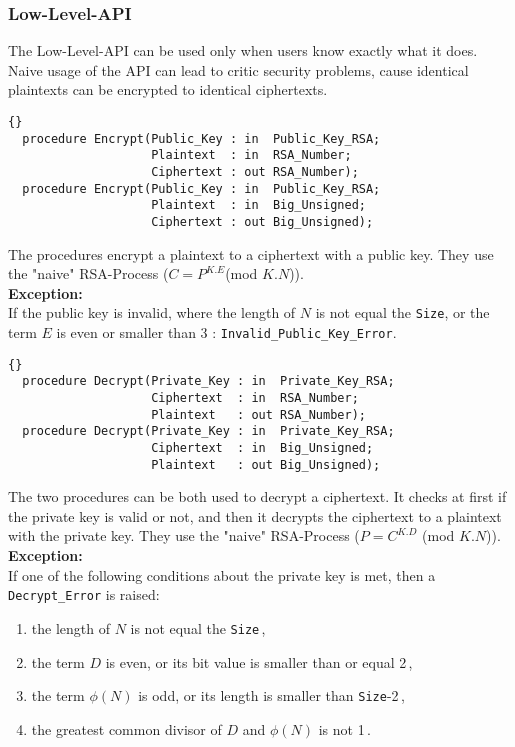 \subsubsection*{Low-Level-API}
The Low-Level-API can be used only when users know exactly what it
does. Naive usage of the API can lead to critic security problems,
cause identical plaintexts can be encrypted to identical ciphertexts.
\begin{lstlisting}{}
  procedure Encrypt(Public_Key : in  Public_Key_RSA;
                    Plaintext  : in  RSA_Number;
                    Ciphertext : out RSA_Number);
  procedure Encrypt(Public_Key : in  Public_Key_RSA;
                    Plaintext  : in  Big_Unsigned;
                    Ciphertext : out Big_Unsigned);
\end{lstlisting}
The procedures encrypt a plaintext to a ciphertext with a public
key. They use the "naive" RSA-Process ($C=P^{K.E}$(mod $K.N$)).\\

\noindent\textbf{Exception:}\\
If the public key is invalid, where the length of $N$ is not equal the
\texttt{Size}, or the term $E$ is even or smaller than 3 :\quad
\texttt{Invalid\_Public\_Key\_Error}.

\hhline
\begin{lstlisting}{}
  procedure Decrypt(Private_Key : in  Private_Key_RSA;
                    Ciphertext  : in  RSA_Number;
                    Plaintext   : out RSA_Number);
  procedure Decrypt(Private_Key : in  Private_Key_RSA;
                    Ciphertext  : in  Big_Unsigned;
                    Plaintext   : out Big_Unsigned);
\end{lstlisting}
The two procedures can be both used to decrypt a ciphertext. It checks
at first if the private key is valid or not, and then it decrypts the
ciphertext to a plaintext with the private key. They use the "naive"
RSA-Process ($P=C^{K.D}$ (mod $K.N$)).\\

\noindent\textbf{Exception:}\\ If one of the following conditions
about the private key is met, then a \texttt{Decrypt\_Error} is
raised:
\begin{enumerate}
\item the length of $N$ is not equal the \texttt{Size}\,,
\item the term $D$ is even, or its bit value is smaller than or equal 2\,,
\item the term $\phi(N)$ is odd, or its length is smaller than \texttt{Size}-2\,,
\item the greatest common divisor of $D$ and $\phi(N)$ is not 1\,.
\end{enumerate}

